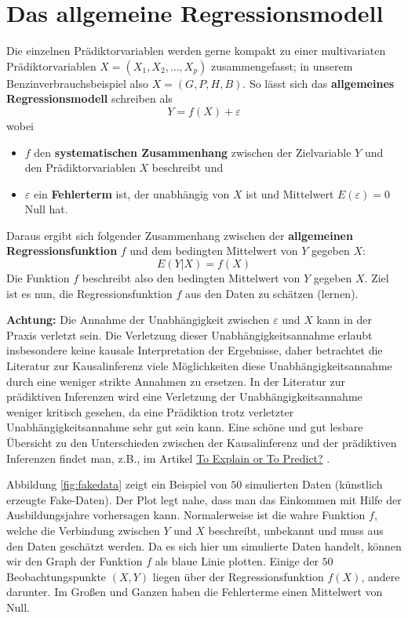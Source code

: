 \documentclass[
  ngerman,
]{book}
\providecommand{\tightlist}{%
  \setlength{\itemsep}{0pt}\setlength{\parskip}{0pt}}
\begin{document}
\hypertarget{das-allgemeine-regressionsmodell}{%
\section{Das allgemeine Regressionsmodell}\label{das-allgemeine-regressionsmodell}}

Die einzelnen Prädiktorvariablen werden gerne kompakt zu einer multivariaten Prädiktorvariablen \(X=(X_1,X_2,\dots,X_p)\) zusammengefasst; in unserem Benzinverbrauchsbeispiel also \(X=(G,P,H,B)\). So lässt sich das \textbf{allgemeines Regressionsmodell} schreiben als
\[
Y=f(X)+\varepsilon
\]
wobei

\begin{itemize}
\tightlist
\item
  \(f\) den \textbf{systematischen Zusammenhang} zwischen der Zielvariable \(Y\) und den Prädiktorvariablen \(X\) beschreibt und
\item
  \(\varepsilon\) ein \textbf{Fehlerterm} ist, der unabhängig von \(X\) ist und Mittelwert \(E(\varepsilon)=0\) Null hat.
\end{itemize}

Daraus ergibt sich folgender Zusammenhang zwischen der \textbf{allgemeinen Regressionsfunktion} \(f\) und dem bedingten Mittelwert von \(Y\) gegeben \(X\):
\[
E(Y|X)=f(X)
\]
Die Funktion \(f\) beschreibt also den bedingten Mittelwert von \(Y\) gegeben \(X\). Ziel ist es nun, die Regressionsfunktion \(f\) aus den Daten zu schätzen (lernen).

\textbf{Achtung:} Die Annahme der Unabhängigkeit zwischen \(\varepsilon\) und \(X\) kann in der Praxis verletzt sein. Die Verletzung dieser Unabhängigkeitsannahme erlaubt insbesondere keine kausale Interpretation der Ergebnisse, daher betrachtet die Literatur zur Kausalinferenz viele Möglichkeiten diese Unabhängigkeitsannahme durch eine weniger strikte Annahmen zu ersetzen. In der Literatur zur prädiktiven Inferenzen wird eine Verletzung der Unabhängigkeitsannahme weniger kritisch gesehen, da eine Prädiktion trotz verletzter Unabhängigkeitsannahme sehr gut sein kann. Eine schöne und gut lesbare Übersicht zu den Unterschieden zwischen der Kausalinferenz und der prädiktiven Inferenzen findet man, z.B., im Artikel \href{https://projecteuclid.org/journals/statistical-science/volume-25/issue-3/To-Explain-or-to-Predict/10.1214/10-STS330.full}{To Explain or To Predict?} \citep{Shmueli_2010}.

Abbildung \ref{fig:fakedata} zeigt ein Beispiel von \(50\) simulierten Daten (künstlich erzeugte Fake-Daten). Der Plot legt nahe, dass man das Einkommen mit Hilfe der Ausbildungsjahre vorhersagen kann. Normalerweise ist die wahre Funktion \(f\), welche die Verbindung zwischen \(Y\) und \(X\) beschreibt, unbekannt und muss aus den Daten geschätzt werden. Da es sich hier um simulierte Daten handelt, können wir den Graph der Funktion \(f\) als blaue Linie plotten. Einige der \(50\) Beobachtungspunkte \((X,Y)\) liegen über der Regressionsfunktion \(f(X)\), andere darunter. Im Großen und Ganzen haben die Fehlerterme einen Mittelwert von Null.
\end{document}
